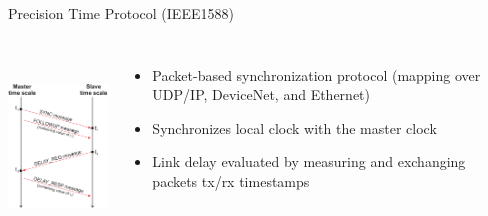 \documentclass[compress,red]{beamer}
\begin{document}
\begin{frame}{Precision Time Protocol (IEEE1588)}

\begin{columns}[c]
  \column{1.5in}
      \begin{center}
	\includegraphics[height=5cm]{protocol/ptp_exchange.pdf}
      \end{center}
  \column{2.5in}
      \begin{itemize}
	  \item Packet-based synchronization protocol (mapping over UDP/IP, DeviceNet, and Ethernet)
	  \item Synchronizes local clock with the master clock
	  \item Link delay evaluated by measuring and exchanging packets tx/rx timestamps
      \end{itemize}
  \end{columns}

\end{frame}
% 
\end{document}
